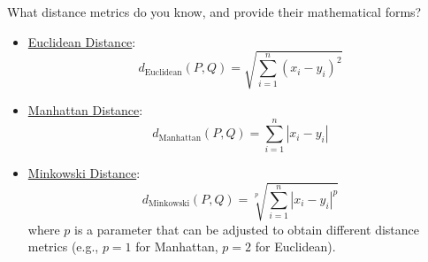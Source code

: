 \begin{ejercicio}
    What distance metrics do you know, and provide their mathematical forms?
    \begin{itemize}
        \item \ul{Euclidean Distance}:
        \begin{equation*}
            d_{\text{Euclidean}}(P, Q) = \sqrt{\sum_{i=1}^{n} (x_i - y_i)^2}
        \end{equation*}
        \item \ul{Manhattan Distance}:
        \begin{equation*}
            d_{\text{Manhattan}}(P, Q) = \sum_{i=1}^{n} |x_i - y_i|
        \end{equation*}
        \item \ul{Minkowski Distance}:
        \begin{equation*}
            d_{\text{Minkowski}}(P, Q) = \sqrt[p]{\sum_{i=1}^{n} |x_i - y_i|^p }
        \end{equation*}
        where $p$ is a parameter that can be adjusted to obtain different distance metrics (e.g., $p=1$ for Manhattan, $p=2$ for Euclidean).
    \end{itemize}
\end{ejercicio}
